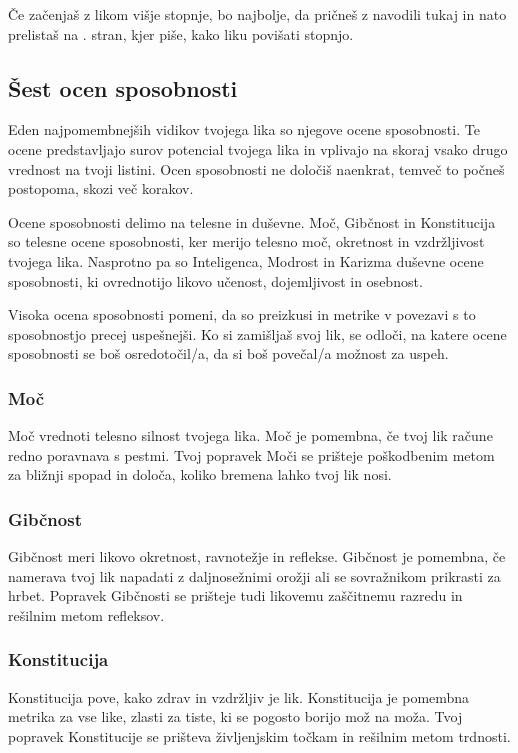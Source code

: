 Če začenjaš z likom višje stopnje, bo najbolje, da pričneš z navodili tukaj in nato prelistaš na \pageref{sub:levelup}. stran, kjer piše, kako liku povišati stopnjo.

\subsection{Šest ocen sposobnosti}
Eden najpomembnejših vidikov tvojega lika so njegove ocene sposobnosti. Te ocene predstavljajo surov potencial tvojega lika in vplivajo na skoraj vsako drugo vrednost na tvoji listini. Ocen sposobnosti ne določiš naenkrat, temveč to počneš postopoma, skozi več korakov.

Ocene sposobnosti delimo na telesne in duševne. Moč, Gibčnost in Konstitucija so telesne ocene sposobnosti, ker merijo telesno moč, okretnost in vzdržljivost tvojega lika. Nasprotno pa so Inteligenca, Modrost in Karizma duševne ocene sposobnosti, ki ovrednotijo likovo učenost, dojemljivost in osebnost.

Visoka ocena sposobnosti pomeni, da so preizkusi in metrike v povezavi s to sposobnostjo precej uspešnejši. Ko si zamišljaš svoj lik, se odloči, na katere ocene sposobnosti se boš osredotočil/a, da si boš povečal/a možnost za uspeh.

\subsubsection{Moč}
Moč vrednoti telesno silnost tvojega lika. Moč je pomembna, če tvoj lik račune redno poravnava s pestmi. Tvoj popravek Moči se prišteje poškodbenim metom za bližnji spopad in določa, koliko bremena lahko tvoj lik nosi.

\subsubsection{Gibčnost}
Gibčnost meri likovo okretnost, ravnotežje in reflekse. Gibčnost je pomembna, če namerava tvoj lik napadati z daljnosežnimi orožji ali se sovražnikom prikrasti za hrbet. Popravek Gibčnosti se prišteje tudi likovemu zaščitnemu razredu in rešilnim metom refleksov.

\subsubsection{Konstitucija}
Konstitucija pove, kako zdrav in vzdržljiv je lik. Konstitucija je pomembna metrika za vse like, zlasti za tiste, ki se pogosto borijo mož na moža. Tvoj popravek Konstitucije se prišteva življenjskim točkam in rešilnim metom trdnosti.

